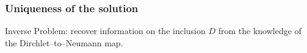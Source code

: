 \documentclass[10pt,xcolor={dvipsnames}]{beamer}
\theoremstyle{plain}
\theoremstyle{plain}
\begin{document}
\begin{frame}
 \frametitle{Uniqueness of the solution}
\begin{block}{}
{\color{blue}Inverse Problem}: recover information on the inclusion $D$ from the knowledge of the Dirchlet--to--Neumann
map.
\end{block}
\begin{enumerate}
\end{enumerate}
\end{frame}
\end{document}
